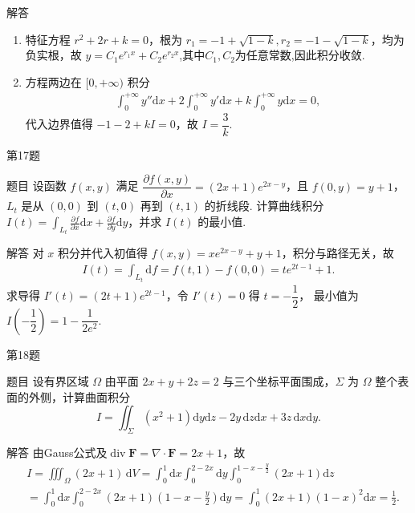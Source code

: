 \documentclass[aspectratio=169]{beamer}
\begin{document}
\begin{frame}
\begin{block}{解答}
\begin{enumerate}[(1)]
\item 特征方程 \(r^2+2r+k=0\)，根为 \(r_1=-1+\sqrt{1-k},r_2=-1-\sqrt{1-k}\)，均为负实根，故 \(y=C_1e^{r_1x}+C_2e^{r_2x}\),其中$C_1,C_2$为任意常数,因此积分收敛.

\item 方程两边在 \([0,+\infty)\) 积分
\begin{align*}
\int_0^{+\infty} y''\mathrm{d}x + 2\int_0^{+\infty} y'\mathrm{d}x + k\int_0^{+\infty} y\mathrm{d}x = 0,
\end{align*}
代入边界值得 \(-1-2 + kI=0\)，故 \(I=\dfrac{3}{k}\).
\end{enumerate}    
\end{block}
\end{frame}

\begin{frame}{第17题}
\begin{block}{题目}
设函数 \(f(x, y)\) 满足 \(\dfrac{\partial f(x, y)}{\partial x}=(2 x+1) e^{2 x-y}\)，且 \(f(0, y)=y+1\)，\(L_t\) 是从 \((0,0)\) 到 \((t,0)\) 再到 \((t,1)\) 的折线段. 计算曲线积分 \(I(t)=\displaystyle\int_{L_{t}} \frac{\partial f}{\partial x} \mathrm{d} x+\frac{\partial f}{\partial y} \mathrm{d} y\)，并求 \(I(t)\) 的最小值.
\end{block}
\begin{block}{解答}
对 $x$ 积分并代入初值得 \(f(x,y)=x e^{2x-y}+y+1\)，积分与路径无关，故
\begin{align*}
I(t)=\int_{L_t}{\mathrm{d}f}=f(t,1)-f(0,0)=t e^{2t-1}+1.
\end{align*}
求导得 \(I'(t)=(2t+1)e^{2t-1}\)，令 \(I'(t)=0\) 得 \(t=-\dfrac12\)，
最小值为 \(I\!\left(-\dfrac12\right)=1-\dfrac{1}{2e^2}\).
\end{block}
\end{frame}

\begin{frame}{第18题}
\begin{block}{题目}
设有界区域 \(\Omega\) 由平面 \(2 x+y+2 z=2\) 与三个坐标平面围成，\(\Sigma\) 为 \(\Omega\) 整个表面的外侧，计算曲面积分
\[I=\iint_{\Sigma}\left(x^{2}+1\right) \mathrm{d} y \mathrm{d} z-2 y \,\mathrm{d} z \mathrm{d} x+3 z \,\mathrm{d} x \mathrm{d} y.\]
\end{block}
\begin{block}{解答}
由Gauss公式及\(\operatorname{div}\boldsymbol{F}=\nabla\cdot \boldsymbol{F}=2x+1\)，故
\begin{align*}
&I=\iiint_{\Omega}{\left( 2x+1 \right) \,\mathrm{d}V}=\int_0^1{\mathrm{d}x\int_0^{2-2x}{\mathrm{d}y\int_0^{1-x-\frac{y}{2}}{\left( 2x+1 \right) \mathrm{d}z}}}
\\
&=\int_0^1{\mathrm{d}x\int_0^{2-2x}{\left( 2x+1 \right) \left( 1-x-\frac{y}{2} \right) \mathrm{d}y}}
=\int_0^1{\left( 2x+1 \right) \left( 1-x \right) ^2\mathrm{d}x}=\frac{1}{2}.
\end{align*}
\end{block}
\end{frame}
\end{document}
